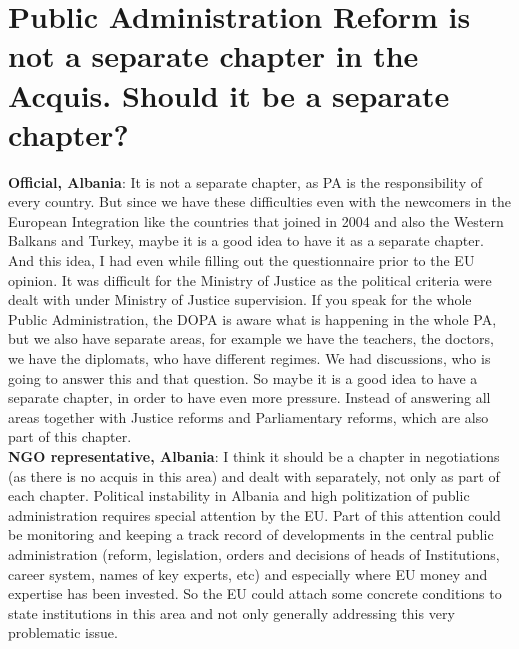 \section{ Public Administration Reform is not a separate chapter in the Acquis. Should it be a separate chapter?}
\label{sec:par chapter}
\textbf{Official, Albania}: It is not a separate chapter, as PA is the responsibility of every country. But since we have these difficulties even with the newcomers in the European Integration like the countries that joined in 2004 and also the Western Balkans and Turkey, maybe it is a good idea to have it as a separate chapter. And this idea, I had even while filling out the questionnaire prior to the EU opinion. It was difficult for the Ministry of Justice as the political criteria were dealt with under Ministry of Justice supervision. If you speak for the whole Public Administration, the DOPA is aware what is happening in the whole PA, but we also have separate areas, for example we have the teachers, the doctors, we have the diplomats, who have different regimes. We had discussions, who is going to answer this and that question. So maybe it is a good idea to have a separate chapter, in order to have even more pressure. Instead of answering all areas together with Justice reforms and Parliamentary reforms, which are also part of this chapter. \\
\textbf{NGO representative, Albania}: I think it should be a chapter in negotiations (as there is no acquis in this area) and dealt with separately, not only as part of each chapter. Political instability in Albania and high politization of public administration requires special attention by the EU. Part of this attention could be monitoring and keeping a track record of developments in the central public administration (reform, legislation, orders and decisions of heads of Institutions, career system, names of key experts, etc) and especially where EU money and expertise has been invested. So the EU could attach some concrete conditions to state institutions in this area and not only generally addressing this very problematic issue.  \\
